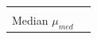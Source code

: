 \documentclass[
]{book}
\begin{document}
\begin{longtable}[]{@{}
  >{\raggedright\arraybackslash}p{}
  >{\raggedright\arraybackslash}p{}@{}}
                                                                                                                                                                                                                                                                                                                                                                                                                                                                                                                                                                                                                                                                                                                                                                                                                                                                                                                                                                                                      \) \\
Median \(\mu_{med}\) & \(                                                                                                                                                                                                                                                                                                                                                                                                                                                                                                                                                                                                                                                                                                                                                                                                                                                                                                                                                                                                                                                                                                                                                                   

\end{longtable}
\end{document}
